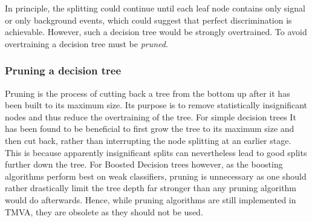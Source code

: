 In principle, the splitting could continue until each leaf node
contains only signal or only background events, which could suggest
that perfect discrimination is achievable.  However, such a decision
tree would be strongly overtrained.  To avoid overtraining a decision
tree must be {\em pruned}.

\subsubsection*{Pruning a decision tree}

Pruning is the process of cutting back a tree from the
bottom up after it has been built to its maximum size. Its purpose is
to remove statistically insignificant nodes and thus reduce the
overtraining of the tree. For simple decision trees It has been found
to be beneficial to first grow the tree to its maximum size and then
cut back, rather than interrupting the node splitting at an earlier
stage. This is because apparently insignificant splits can
nevertheless lead to good splits further down the tree. For Boosted Decision trees
however, as the boosting algorithms perform best on weak classifiers, pruning
is unnecessary as one should rather drastically limit the tree depth far 
stronger than any pruning algorithm would do afterwards. Hence, while pruning
algorithms are still implemented in TMVA, they are obsolete as they should
not be used.
%
%
%

